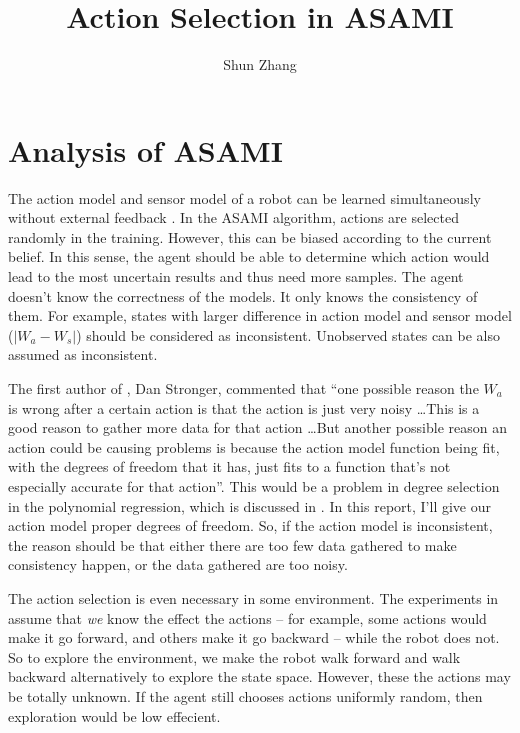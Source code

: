 \documentclass[10pt]{IEEEtran}
\title{Action Selection in ASAMI}
\author{Shun Zhang}
\date{}
\begin{document}
\maketitle


\sloppy

\section{Analysis of ASAMI}

The action model and sensor model of a robot can be learned
simultaneously without external feedback \cite{CSJ06}.  In the ASAMI
algorithm, actions are selected randomly in the training. However,
this can be biased according to the current belief.  In this sense,
the agent should be able to determine which action would lead to the
most uncertain results and thus need more samples.  The agent doesn't
know the correctness of the models. It only knows the consistency of
them. For example, states with larger difference in action model and
sensor model ($|W_a - W_s|$) should be considered as inconsistent.
Unobserved states can be also assumed as inconsistent.

The first author of \cite{CSJ06}, Dan Stronger, commented that ``one
possible reason the $W_a$ is wrong after a certain action is that the
action is just very noisy \ldots This is a good reason to gather more
data for that action \ldots  But another possible reason  an action
could be causing problems is because the action model function being
fit, with the degrees of freedom that it has, just fits to a function
that's not especially accurate for that action''. This would be a
problem in degree selection in the polynomial regression, which is
discussed in \cite{IJAIT08-stronger}. In this report, I'll give our
action model proper degrees of freedom. So, if the action model is
inconsistent, the reason should be that either there are too few data
gathered to make consistency happen, or the data gathered are too
noisy.

\hfill

The action selection is even necessary in some environment. The
experiments in \cite{CSJ06} assume that \textit{we} know the effect
the actions -- for example, some actions would make it go forward, and
others make it go backward -- while the robot does not. So to explore
the environment, we make the robot walk forward and walk backward
alternatively to explore the state space. However, these the actions
may be totally unknown.  If the agent still chooses actions uniformly
random, then exploration would be low effecient.
\end{document}
